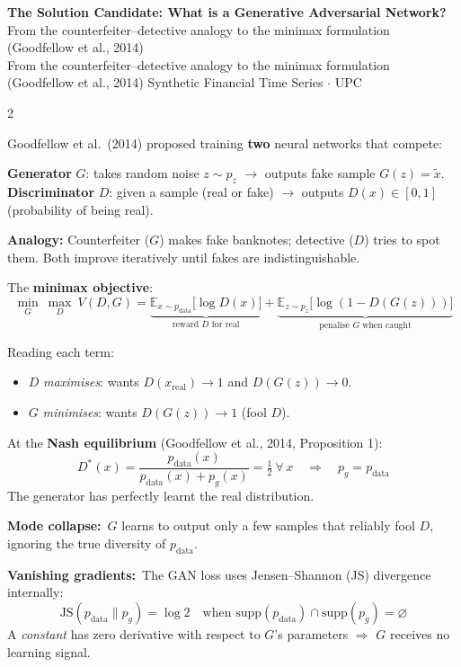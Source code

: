 \documentclass[10pt]{article}
\newcommand{\navybox}[2]{\begin{tcolorbox}[mybox={Navy}{LBg},title={#1}]#2\end{tcolorbox}}
\newcommand{\redbox}[2]{\begin{tcolorbox}[mybox={DRed}{RBg},title={#1}]#2\end{tcolorbox}}
\newcommand{\pagehead}[2]{%
  \begin{tcolorbox}[enhanced,arc=0pt,outer arc=0pt,boxrule=0pt,
    colback=Navy,colframe=Navy,
    top=5pt,bottom=5pt,left=8pt,right=8pt,
    before skip=0pt,after skip=10pt]
  {\color{white}\large\bfseries #1}%
  \ifx\relax#2\relax\else\\[1pt]{\color{blue!30!white}\small #2}\fi
  \hfill{\color{blue!20!white}\footnotesize Synthetic Financial Time Series $\cdot$ UPC}
  \end{tcolorbox}}
\newcommand{\E}{\mathbb{E}}
\begin{document}
\pagehead{The Solution Candidate: What is a Generative Adversarial Network?}
         {From the counterfeiter--detective analogy to the minimax formulation (Goodfellow et al., 2014)}

\begin{multicols}{2}

\navybox{The Core Idea --- A Two-Player Game}{%
Goodfellow et al.\ (2014) proposed training \textbf{two} neural networks that compete:

\smallskip
\textbf{Generator} $G$: takes random noise $z \sim p_z$ $\to$ outputs fake sample $G(z) = \tilde{x}$.
\textbf{Discriminator} $D$: given a sample (real or fake) $\to$ outputs $D(x) \in [0,1]$ (probability of being real).

\smallskip
\textbf{Analogy:} Counterfeiter ($G$) makes fake banknotes; detective ($D$) tries to spot them.
Both improve iteratively until fakes are indistinguishable.

\smallskip
The \textbf{minimax objective}:
\begin{equation*}
  \min_G\ \max_D\ V(D,G) =
  \underbrace{\E_{x \sim p_\text{data}}\!\bigl[\log D(x)\bigr]}_{\text{reward } D \text{ for real}}
  +
  \underbrace{\E_{z \sim p_z}\!\bigl[\log(1 - D(G(z)))\bigr]}_{\text{penalise } G \text{ when caught}}
\end{equation*}

Reading each term:
\begin{itemize}
  \item $D$ \emph{maximises}: wants $D(x_\text{real}) \to 1$ and $D(G(z)) \to 0$.
  \item $G$ \emph{minimises}: wants $D(G(z)) \to 1$ (fool $D$).
\end{itemize}

At the \textbf{Nash equilibrium} (Goodfellow et al., 2014, Proposition 1):
\begin{equation*}
  D^*(x) = \frac{p_\text{data}(x)}{p_\text{data}(x)+p_g(x)} = \tfrac{1}{2}\ \forall\,x
  \quad\Longrightarrow\quad p_g = p_\text{data}
\end{equation*}
The generator has perfectly learnt the real distribution.}

\redbox{Critical Problem: Vanishing Gradients \& Mode Collapse}{%
\textbf{Mode collapse:}\ $G$ learns to output only a few samples that reliably fool $D$, ignoring the true diversity of $p_\text{data}$.

\textbf{Vanishing gradients:}\ The GAN loss uses Jensen--Shannon (JS) divergence internally:
\begin{equation*}
  \text{JS}(p_\text{data} \| p_g) = \log 2 \quad\text{when } \text{supp}(p_\text{data}) \cap \text{supp}(p_g) = \varnothing
\end{equation*}
A \textit{constant} has zero derivative with respect to $G$'s parameters $\Rightarrow$ $G$ receives no learning signal.

}
\end{multicols}
\end{document}
